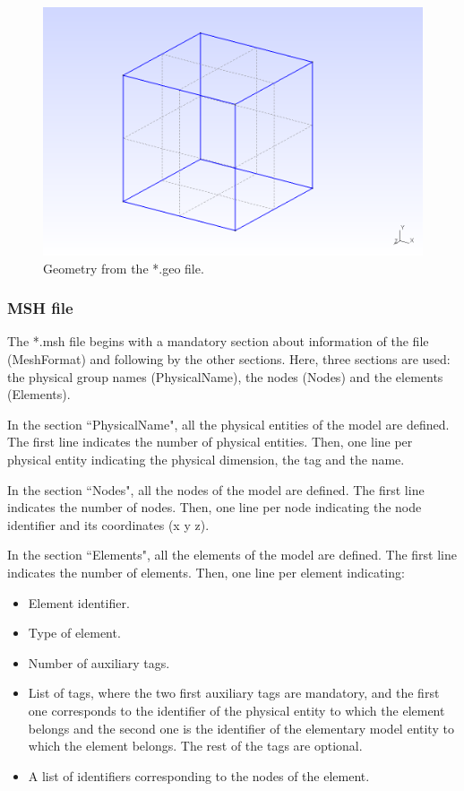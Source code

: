 \documentclass[a4]{article}
\begin{document}
\begin{figure}[h]
	\centering
	\includegraphics[scale = 0.3]{geometry.png}
	\caption{Geometry from the *.geo file.}
	\label{fig:geometry}
\end{figure}

\subsubsection{MSH file}
The *.msh file begins with a mandatory section about information of the file (MeshFormat) and following by the other sections. Here, three sections are used: the physical group names (PhysicalName), the nodes (Nodes) and the elements (Elements).

In the section ``PhysicalName", all the physical entities of the model are defined. The first line indicates the number of physical entities. Then, one line per physical entity indicating the physical dimension, the tag and the name.  
   
In the section ``Nodes", all the nodes of the model are defined. The first line indicates the number of nodes. Then, one line per node indicating the node identifier and its coordinates (x y z).

In the section ``Elements", all the elements of the model are defined. The first line indicates the number of elements. Then, one line per element indicating:

\begin{itemize}
	\item Element identifier.
	\item Type of element.
	\item Number of auxiliary tags.
	\item List of tags, where the two first auxiliary tags are mandatory, and the first one corresponds to the identifier of the physical entity to which the element belongs and the second one is the identifier of the elementary model entity to which the element belongs. The rest of the tags are optional.
	\item A list of identifiers corresponding to the nodes of the element.
\end{itemize}
\end{document}
